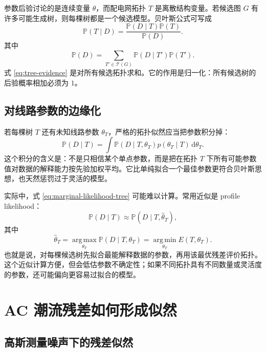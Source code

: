 \documentclass[UTF8,12pt,openany]{ctexrep}
\numberwithin{equation}{chapter}
\theoremstyle{definition}
\theoremstyle{plain}
\newcommand{\Prob}{\mathbb{P}}
\newcommand{\argmin}{\operatorname*{arg\,min}}
\newcommand{\argmax}{\operatorname*{arg\,max}}
\newcommand{\Tcal}{\mathcal{T}}
\newcommand{\dd}{\,\mathrm{d}}
\begin{document}
参数后验讨论的是连续变量 $\theta$，而配电网拓扑 $T$ 是离散结构变量。若候选图 $G$ 有许多可能生成树，则每棵树都是一个候选模型。贝叶斯公式可写成
\begin{equation}
\Prob(T\mid D)
=\frac{\Prob(D\mid T)\Prob(T)}{\Prob(D)}.
\label{eq:tree-posterior}
\end{equation}
其中
\begin{equation}
\Prob(D)=\sum_{T'\in\Tcal(G)}\Prob(D\mid T')\Prob(T').
\label{eq:tree-evidence}
\end{equation}
式 \eqref{eq:tree-evidence} 是对所有候选拓扑求和。它的作用是归一化：所有候选树的后验概率相加必须为 $1$。

\section{对线路参数的边缘化}

若每棵树 $T$ 还有未知线路参数 $\theta_T$，严格的拓扑似然应当把参数积分掉：
\begin{equation}
\Prob(D\mid T)
=\int \Prob(D\mid T,\theta_T)p(\theta_T\mid T)\dd\theta_T.
\label{eq:marginal-likelihood-tree}
\end{equation}
这个积分的含义是：不是只相信某个单点参数，而是把在拓扑 $T$ 下所有可能参数值对数据的解释能力按先验加权平均。它比单纯拟合一个最佳参数更符合贝叶斯思想，也天然惩罚过于灵活的模型。

实际中，式 \eqref{eq:marginal-likelihood-tree} 可能难以计算。常用近似是 profile likelihood：
\begin{equation}
\Prob(D\mid T)
\approx \Prob(D\mid T,\hat{\theta}_T),
\label{eq:profile-likelihood}
\end{equation}
其中
\begin{equation}
\hat{\theta}_T
=\argmax_{\theta_T}\Prob(D\mid T,\theta_T)
=\argmin_{\theta_T}E(T,\theta_T).
\label{eq:theta-profile}
\end{equation}
也就是说，对每棵候选树先拟合最能解释数据的参数，再用该最优残差评价拓扑。这个近似计算方便，但会低估参数不确定性；如果不同拓扑具有不同数量或灵活度的参数，还可能偏向更容易过拟合的模型。

\chapter{AC 潮流残差如何形成似然}

\section{高斯测量噪声下的残差似然}
\end{document}
